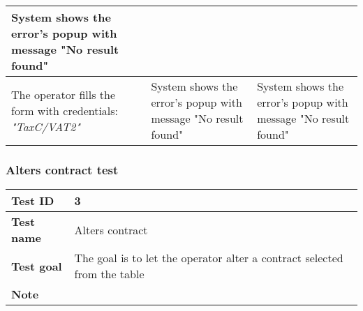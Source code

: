 {{{\begin{center}
\begin{tabular}{|p{4cm}|p{5cm}|p{5cm}|}
				\vspace{1mm} System shows the error's popup with message "No result found" \vspace{1mm} \\
			\hline
				\vspace{1mm} The operator fills the form with credentials: \itshape{"TaxC/VAT2"} \vspace{1mm} &
				\vspace{1mm} System shows the error's popup with message "No result found" \vspace{1mm} & 
				\vspace{1mm} System shows the error's popup with message "No result found" \vspace{1mm} \\
			\hline
			\end{tabular}
			\end{center}
		}
		\clearpage

		\subsubsection{Alters contract test}{
			\begin{center}
			\begin{tabular}{|p{4cm}|p{10cm}|}
			\hline
				\centering \vspace{1mm} \bfseries{Test ID} \vspace{1mm} & 
				\vspace{1mm} 3 \vspace{1mm}\\
			\hline
				\centering \vspace{1mm} \bfseries{Test name} \vspace{1mm} & 
				\vspace{1mm} Alters contract\vspace{1mm}\\
			\hline
				\centering \vspace{1mm} \bfseries{Test goal} \vspace{1mm} & 
				\vspace{1mm} The goal is to let the operator alter a contract selected from the table\vspace{1mm}\\
			\hline
				\centering \vspace{1mm} \bfseries{Note} \vspace{1mm} & 
				\vspace{1mm}  \vspace{1mm}\\
			\hline
			\end{tabular}


\end{center}}}}

